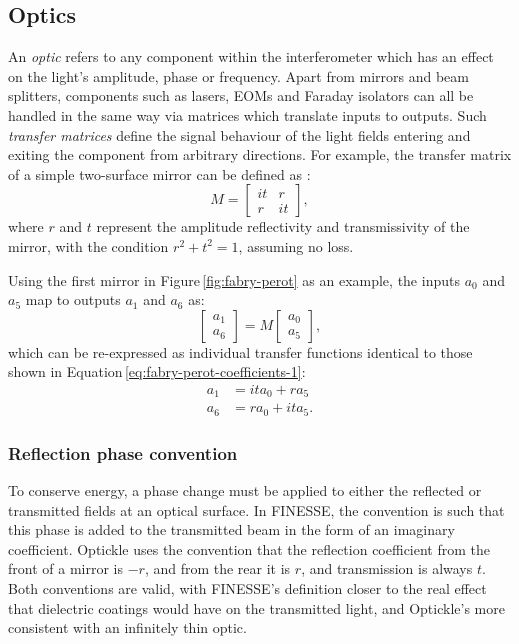 \subsection{Optics}
An \emph{optic} refers to any component within the interferometer which has an effect on the light's amplitude, phase or frequency. Apart from mirrors and beam splitters, components such as lasers, \glspl{EOM} and Faraday isolators can all be handled in the same way via matrices which translate inputs to outputs. Such \emph{transfer matrices} define the signal behaviour of the light fields entering and exiting the component from arbitrary directions. For example, the transfer matrix of a simple two-surface mirror can be defined as \cite{Freise2010}:
\begin{equation}
  M =
  \begin{bmatrix}
    it & r \\
    r & it
  \end{bmatrix},
\end{equation}
where $r$ and $t$ represent the amplitude reflectivity and transmissivity of the mirror, with the condition $r^2 + t^2 = 1$, assuming no loss.

Using the first mirror in Figure\,\ref{fig:fabry-perot} as an example, the inputs $a_0$ and $a_5$ map to outputs $a_1$ and $a_6$ as:
\begin{equation}
  \begin{bmatrix}
    a_1 \\
    a_6
  \end{bmatrix}
  =
  M
  \begin{bmatrix}
    a_0 \\
    a_5
  \end{bmatrix}
  ,
\end{equation}
which can be re-expressed as individual transfer functions identical to those shown in Equation\,\ref{eq:fabry-perot-coefficients-1}:
\begin{equation}
  \begin{split}
    a_1 &= it a_0 + r a_5 \\
    a_6 &= r a_0 + it a_5.
  \end{split}
\end{equation}

\subsubsection{\label{a:reflection-phase}Reflection phase convention}
To conserve energy, a phase change must be applied to either the reflected or transmitted fields at an optical surface. In \gls{FINESSE}, the convention is such that this phase is added to the transmitted beam in the form of an imaginary coefficient. Optickle uses the convention that the reflection coefficient from the front of a mirror is $-r$, and from the rear it is $r$, and transmission is always $t$. Both conventions are valid, with \gls{FINESSE}'s definition closer to the real effect that dielectric coatings would have on the transmitted light, and Optickle's more consistent with an infinitely thin optic.

